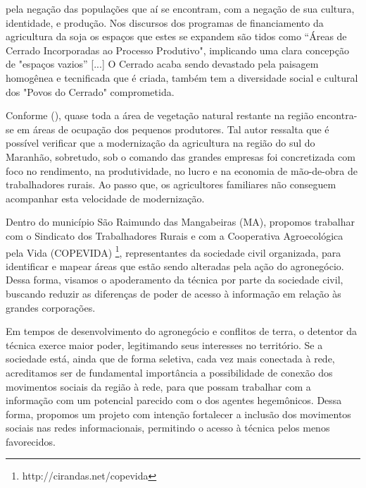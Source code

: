 \begin{citacao}
pela negação das populações que aí se encontram, com a negação de sua cultura, identidade, e produção. Nos discursos dos programas de financiamento da agricultura da soja os espaços que estes se expandem são tidos como “Áreas de Cerrado Incorporadas ao Processo Produtivo", implicando uma clara concepção de "espaços vazios” [...] O Cerrado acaba sendo devastado pela paisagem homogênea e tecnificada que é criada,  também tem a diversidade social e cultural dos "Povos do Cerrado" comprometida. \cite[p. 13]{rodrigues_alencar}
\end{citacao}

Conforme  (\citeyear{studte2008}), quase toda a área de vegetação natural restante na região encontra-se em áreas de ocupação dos pequenos produtores. Tal autor ressalta que é possível verificar que a modernização  da  agricultura na  região do sul do Maranhão, sobretudo, sob o comando  das grandes empresas foi concretizada  com foco no rendimento,  na produtividade, no lucro e na economia de mão-de-obra de trabalhadores rurais.  Ao passo que, os agricultores familiares não conseguem acompanhar esta velocidade de modernização.

Dentro do município São Raimundo das Mangabeiras (MA), propomos trabalhar com o Sindicato dos Trabalhadores Rurais e com a Cooperativa Agroecológica pela Vida (COPEVIDA) \footnote{http://cirandas.net/copevida}, representantes da sociedade civil organizada, para identificar e mapear áreas que estão sendo alteradas pela ação do agronegócio. Dessa forma, visamos o apoderamento da técnica por parte da sociedade civil, buscando reduzir as diferenças de poder de acesso à informação em relação às grandes corporações.

Em tempos de desenvolvimento do agronegócio e conflitos de terra, o detentor da técnica exerce maior poder, legitimando seus interesses no território. Se a sociedade está, ainda que de forma seletiva, cada vez mais conectada à rede, acreditamos ser de fundamental importância a possibilidade de conexão dos movimentos sociais da região à rede, para que possam trabalhar com a informação com um potencial parecido com o dos agentes hegemônicos. Dessa forma, propomos um projeto com intenção fortalecer a inclusão dos movimentos sociais nas redes informacionais, permitindo o acesso à técnica pelos menos favorecidos.

